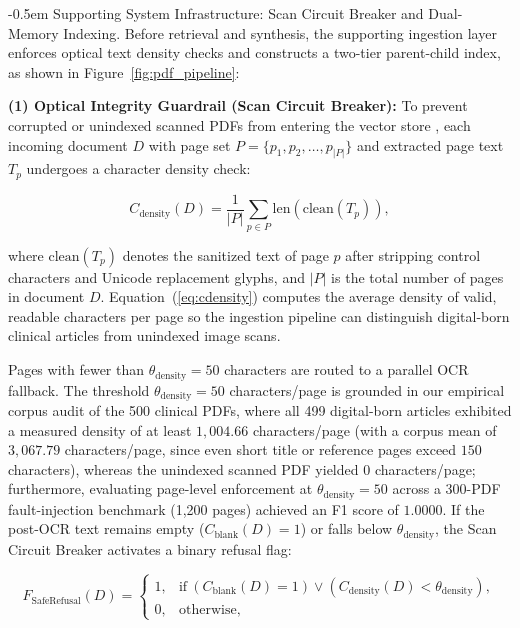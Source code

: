 \documentclass[10pt]{SPIIRAS_Proceedings}
\makeatletter
\renewcommand\subsection{\@startsection{subsection}{2}{\parindent}%
  {\z@}%
  {-0.5em}%
  {\normalfont\normalsize\bfseries}}
\makeatother
\begin{document}
\subsection{Supporting System Infrastructure: Scan Circuit Breaker and Dual-Memory Indexing.} \label{sec:parent_child} Before retrieval and synthesis, the supporting ingestion layer enforces optical text density checks and constructs a two-tier parent-child index, as shown in Figure~\ref{fig:pdf_pipeline}:

\textbf{(1) Optical Integrity Guardrail (Scan Circuit Breaker):} To prevent corrupted or unindexed scanned PDFs from entering the vector store \cite{lo2020s2orc,gao2023retrieval,yan2024corrective}, each incoming document $D$ with page set $P = \{p_1, p_2, \dots, p_{|P|}\}$ and extracted page text $T_p$ undergoes a character density check:

\begin{equation}
C_{\mathrm{density}}(D) = \frac{1}{|P|} \sum_{p \in P} \mathrm{len}(\mathrm{clean}(T_p)),
\label{eq:cdensity}
\end{equation}

\noindent where $\mathrm{clean}(T_p)$ denotes the sanitized text of page $p$ after stripping control characters and Unicode replacement glyphs, and $|P|$ is the total number of pages in document $D$. Equation~(\ref{eq:cdensity}) computes the average density of valid, readable characters per page so the ingestion pipeline can distinguish digital-born clinical articles from unindexed image scans.

Pages with fewer than $\theta_{\mathrm{density}} = 50$ characters are routed to a parallel OCR fallback. The threshold $\theta_{\mathrm{density}} = 50$ characters/page is grounded in our empirical corpus audit of the 500 clinical PDFs, where all 499 digital-born articles exhibited a measured density of at least $1,004.66$ characters/page (with a corpus mean of $3,067.79$ characters/page, since even short title or reference pages exceed $150$ characters), whereas the unindexed scanned PDF yielded $0$ characters/page; furthermore, evaluating page-level enforcement at $\theta_{\mathrm{density}} = 50$ across a 300-PDF fault-injection benchmark (1,200 pages) achieved an F1 score of $1.0000$. If the post-OCR text remains empty ($C_{\mathrm{blank}}(D) = 1$) or falls below $\theta_{\mathrm{density}}$, the Scan Circuit Breaker activates a binary refusal flag:

\begin{equation}
F_{\mathrm{SafeRefusal}}(D) = 
\begin{cases} 
1, & \mathrm{if}\ (C_{\mathrm{blank}}(D) = 1) \lor (C_{\mathrm{density}}(D) < \theta_{\mathrm{density}}), \\
0, & \mathrm{otherwise},
\end{cases}
\label{eq:saferefusal}
\end{equation}
\end{document}
